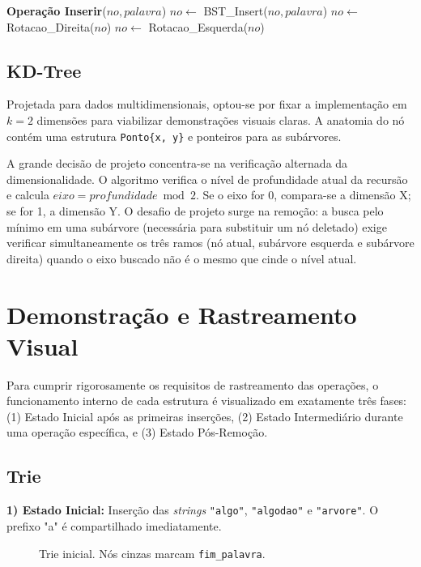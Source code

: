 \documentclass[conference]{IEEEtran}
\begin{document}
\begin{algorithmic}[1]
\STATE \textbf{Operação Inserir}($no, palavra$)
\STATE $no \leftarrow$ BST\_Insert($no, palavra$)
    \STATE $no \leftarrow$ Rotacao\_Direita($no$)
    \STATE $no \leftarrow$ Rotacao\_Esquerda($no$)
\ENDIF
\end{algorithmic}

\subsection{KD-Tree}
Projetada para dados multidimensionais, optou-se por fixar a implementação em $k=2$ dimensões para viabilizar demonstrações visuais claras. A anatomia do nó contém uma estrutura \texttt{Ponto\{x, y\}} e ponteiros para as subárvores.

A grande decisão de projeto concentra-se na verificação alternada da dimensionalidade. O algoritmo verifica o nível de profundidade atual da recursão e calcula $eixo = profundidade \bmod 2$. Se o eixo for 0, compara-se a dimensão X; se for 1, a dimensão Y. O desafio de projeto surge na remoção: a busca pelo mínimo em uma subárvore (necessária para substituir um nó deletado) exige verificar simultaneamente os três ramos (nó atual, subárvore esquerda e subárvore direita) quando o eixo buscado não é o mesmo que cinde o nível atual.

\section{Demonstração e Rastreamento Visual}

Para cumprir rigorosamente os requisitos de rastreamento das operações, o funcionamento interno de cada estrutura é visualizado em exatamente três fases: (1) Estado Inicial após as primeiras inserções, (2) Estado Intermediário durante uma operação específica, e (3) Estado Pós-Remoção.

\subsection{Trie}

\textbf{1) Estado Inicial:} Inserção das \textit{strings} \texttt{"algo"}, \texttt{"algodao"} e \texttt{"arvore"}. O prefixo "a" é compartilhado imediatamente.
\begin{figure}[htbp]
\centering
{}
\caption{Trie inicial. Nós cinzas marcam \texttt{fim\_palavra}.}
\label{fig:trie1}
\end{figure}
\end{document}
